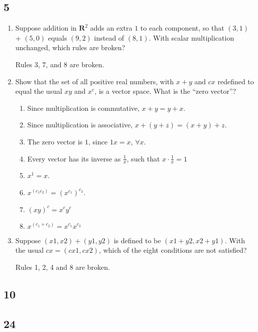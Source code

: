 \documentclass[12pt,letterpaper]{article}
\begin{document}
    \subsection*{5}
      \begin{enumerate}
        \item
          Suppose addition in $\mathbf{R}^2$
          adds an extra $1$ to each component,
          so that $(3, 1)$ + $(5, 0)$ equals $(9, 2)$ instead of $(8, 1)$.
          With scalar multiplication unchanged,
          which rules are broken?

          Rules 3, 7, and 8 are broken.

        \item
          Show that the set of all positive real numbers,
          with $x+y$ and $cx$ redeﬁned to equal the usual $xy$ and $x^c$,
          is a vector space.
          What is the ``zero vector''?

          \begin{enumerate}
            \item Since multiplication is commutative, $x + y = y + x$.
            \item Since multiplication is associative, $x + (y + z) = (x + y) + z$.
            \item The zero vector is $1$, since $1x = x$, $\forall x$.
            \item Every vector has its inverse as $\frac{1}{x}$, such that $x \cdot \frac{1}{x} = 1$
            \item $x^1 = x$.
            \item $x^{(c_1c_2)} = (x^{c_1})^{c_2}$.
            \item $(xy)^c = x^cy^c$
            \item $x^{(c_1+c_2)} = x^{c_1}x^{c_2}$
          \end{enumerate}

        \item
          Suppose $(x1, x2) + (y1, y2)$ is defined to be $(x1 + y2, x2 + y1)$.
          With the usual $cx = (cx1, cx2)$,
          which of the eight conditions are not satisﬁed?

          Rules 1, 2, 4 and 8 are broken.
      \end{enumerate}
    \subsection*{10}
    \subsection*{24}
\end{document}
